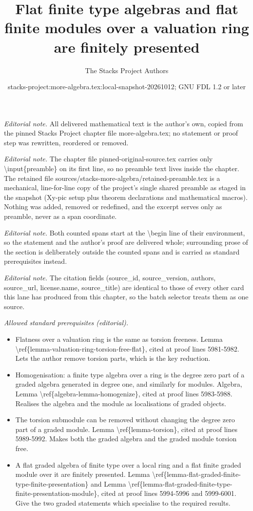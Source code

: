 \documentclass[10pt,a4paper]{amsart}
\title{Flat finite type algebras and flat finite modules over a valuation ring are finitely presented}
\author{The Stacks Project Authors}
\date{stacks-project:more-algebra.tex:local-snapshot-20261012; GNU FDL 1.2 or later}
\theoremstyle{plain}
\theoremstyle{definition}
\theoremstyle{remark}
\numberwithin{equation}{subsection}
\begin{document}
\maketitle
\setcounter{subsection}{1}
\noindent\textit{Editorial note.} All delivered mathematical text is the author's own, copied from the pinned Stacks Project chapter file more-algebra.tex; no statement or proof step was rewritten, reordered or removed.\par\medskip
\noindent\textit{Editorial note.} The chapter file pinned-original-source.tex carries only \textbackslash{}input\{preamble\} on its first line, so no preamble text lives inside the chapter. The retained file sources/stacks-more-algebra/retained-preamble.tex is a mechanical, line-for-line copy of the project's single shared preamble as staged in the snapshot (Xy-pic setup plus theorem declarations and mathematical macros). Nothing was added, removed or redefined, and the excerpt serves only as preamble, never as a span coordinate.\par\medskip
\noindent\textit{Editorial note.} Both counted spans start at the \textbackslash{}begin line of their environment, so the statement and the author's proof are delivered whole; surrounding prose of the section is deliberately outside the counted spans and is carried as standard prerequisites instead.\par\medskip
\noindent\textit{Editorial note.} The citation fields (source\_id, source\_version, authors, source\_url, license.name, source\_title) are identical to those of every other card this lane has produced from this chapter, so the batch selector treats them as one source.\par\medskip
\noindent\textit{Allowed standard prerequisites (editorial).}\begin{itemize}
\item Flatness over a valuation ring is the same as torsion freeness. Lemma \textbackslash{}ref\{lemma-valuation-ring-torsion-free-flat\}, cited at proof lines 5981-5982. Lets the author remove torsion parts, which is the key reduction.
\item Homogenisation: a finite type algebra over a ring is the degree zero part of a graded algebra generated in degree one, and similarly for modules. Algebra, Lemma \textbackslash{}ref\{algebra-lemma-homogenize\}, cited at proof lines 5983-5988. Realises the algebra and the module as localisations of graded objects.
\item The torsion submodule can be removed without changing the degree zero part of a graded module. Lemma \textbackslash{}ref\{lemma-torsion\}, cited at proof lines 5989-5992. Makes both the graded algebra and the graded module torsion free.
\item A flat graded algebra of finite type over a local ring and a flat finite graded module over it are finitely presented. Lemma \textbackslash{}ref\{lemma-flat-graded-finite-type-finite-presentation\} and Lemma \textbackslash{}ref\{lemma-flat-graded-finite-type-finite-presentation-module\}, cited at proof lines 5994-5996 and 5999-6001. Give the two graded statements which specialise to the required results.
\end{itemize}\medskip
\end{document}
